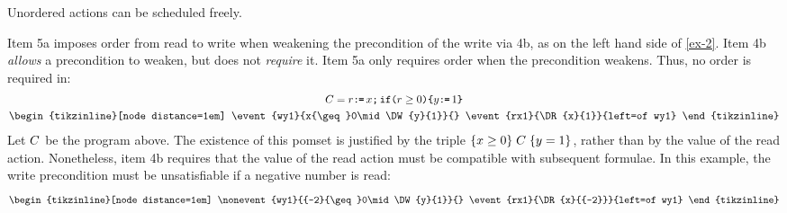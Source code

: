 Unordered actions can be scheduled freely.


Item 5a imposes order from read to write when weakening the
precondition of the write via 4b, as on the left hand side of
\eqref{ex-2}.
Item 4b \emph{allows} a precondition to weaken, but does not \emph{require} it.
Item 5a only requires order when the precondition weakens.
Thus, no order is required in: %
\begin{gather}
  \aCmd=r\GETS x\SEMI\IF{r\geq0}\THEN y\GETS1 \FI
  \label{ex555}
  \\
  \nonumber
  \hbox{\begin{tikzinline}[node distance=1em]
      \event{wy1}{x{\geq}0\mid\DW{y}{1}}{}
      \event{rx1}{\DR{x}{1}}{left=of wy1}
    \end{tikzinline}}
\end{gather}
Let $C$ be the program above.  The existence of this pomset is justified
by the triple $\{x\geq0\}\allowbreak\;C\;\allowbreak\{y=1\}$, rather than by the value of the read
action.  Nonetheless, item 4b requires that the value of the read action must
be compatible with subsequent formulae.  In this example, the write
precondition must be unsatisfiable if a negative number is read:
\begin{gather*}
  \nonumber
  \hbox{\begin{tikzinline}[node distance=1em]
      \nonevent{wy1}{{-2}{\geq}0\mid\DW{y}{1}}{}
      \event{rx1}{\DR{x}{{-2}}}{left=of wy1}
    \end{tikzinline}}
\end{gather*}

